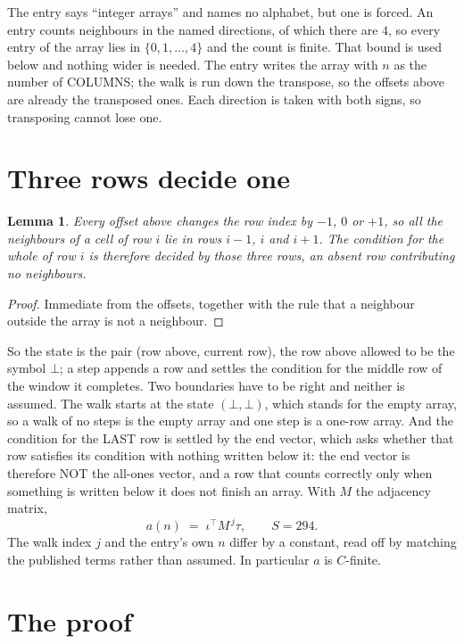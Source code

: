 \documentclass[11pt,a4paper]{article}
\theoremstyle{plain}
\newtheorem{lemma}[theorem]{Lemma}
\theoremstyle{definition}
\begin{document}
The entry says ``integer arrays'' and names no alphabet, but one is forced. An entry counts
neighbours in the named directions, of which there are $4$, so every entry of the array
lies in $\{0,1,\dots,4\}$ and the count is finite. That bound is used below and
nothing wider is needed. The entry writes the array with $n$ as the number of COLUMNS; the walk is run down the transpose, so the offsets above are already the transposed ones. Each direction is taken with both signs, so transposing cannot lose one.

\section{Three rows decide one}

\begin{lemma}\label{lem:win}
Every offset above changes the row index by $-1$, $0$ or $+1$, so all the neighbours of a cell
of row $i$ lie in rows $i-1$, $i$ and $i+1$. The condition for the whole of row $i$ is
therefore decided by those three rows, an absent row contributing no neighbours.
\end{lemma}

\begin{proof}
Immediate from the offsets, together with the rule that a neighbour outside the array is not a
neighbour.
\end{proof}

So the state is the pair (row above, current row), the row above allowed to be the symbol
$\bot$; a step appends a row and settles the condition for the middle row of the window it
completes. Two boundaries have to be right and neither is assumed. The walk starts at the state
$(\bot,\bot)$, which stands for the empty array, so a walk of no steps is the empty array and
one step is a one-row array. And the condition for the LAST row is settled by the end vector,
which asks whether that row satisfies its condition with nothing written below it: the end
vector is therefore NOT the all-ones vector, and a row that counts correctly only when
something is written below it does not finish an array. With $M$ the adjacency matrix,
\[
a(n)\;=\;\iota^{\!\top}M^{\,j}\tau ,\qquad S=294.
\]
The walk index $j$ and the entry's own $n$ differ by a constant, read off by matching the
published terms rather than assumed. In particular $a$ is $C$-finite.

\section{The proof}
\end{document}
